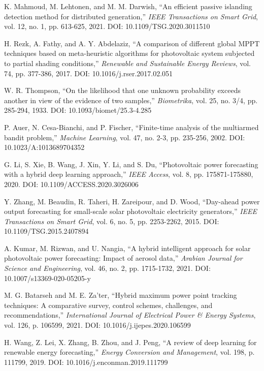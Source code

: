 \documentclass[conference]{IEEEtran}
\begin{document}
\begin{thebibliography}{00}

 K. Mahmoud, M. Lehtonen, and M. M. Darwish, ``An efficient passive islanding detection method for distributed generation,'' \emph{IEEE Transactions on Smart Grid}, vol. 12, no. 1, pp. 613-625, 2021. DOI: 10.1109/TSG.2020.3011510

 H. Rezk, A. Fathy, and A. Y. Abdelaziz, ``A comparison of different global MPPT techniques based on meta-heuristic algorithms for photovoltaic system subjected to partial shading conditions,'' \emph{Renewable and Sustainable Energy Reviews}, vol. 74, pp. 377-386, 2017. DOI: 10.1016/j.rser.2017.02.051

 W. R. Thompson, ``On the likelihood that one unknown probability exceeds another in view of the evidence of two samples,'' \emph{Biometrika}, vol. 25, no. 3/4, pp. 285-294, 1933. DOI: 10.1093/biomet/25.3-4.285

 P. Auer, N. Cesa-Bianchi, and P. Fischer, ``Finite-time analysis of the multiarmed bandit problem,'' \emph{Machine Learning}, vol. 47, no. 2-3, pp. 235-256, 2002. DOI: 10.1023/A:1013689704352

 G. Li, S. Xie, B. Wang, J. Xin, Y. Li, and S. Du, ``Photovoltaic power forecasting with a hybrid deep learning approach,'' \emph{IEEE Access}, vol. 8, pp. 175871-175880, 2020. DOI: 10.1109/ACCESS.2020.3026006

 Y. Zhang, M. Beaudin, R. Taheri, H. Zareipour, and D. Wood, ``Day-ahead power output forecasting for small-scale solar photovoltaic electricity generators,'' \emph{IEEE Transactions on Smart Grid}, vol. 6, no. 5, pp. 2253-2262, 2015. DOI: 10.1109/TSG.2015.2407894

 A. Kumar, M. Rizwan, and U. Nangia, ``A hybrid intelligent approach for solar photovoltaic power forecasting: Impact of aerosol data,'' \emph{Arabian Journal for Science and Engineering}, vol. 46, no. 2, pp. 1715-1732, 2021. DOI: 10.1007/s13369-020-05205-y

 M. G. Batarseh and M. E. Za'ter, ``Hybrid maximum power point tracking techniques: A comparative survey, control schemes, challenges, and recommendations,'' \emph{International Journal of Electrical Power \& Energy Systems}, vol. 126, p. 106599, 2021. DOI: 10.1016/j.ijepes.2020.106599

 H. Wang, Z. Lei, X. Zhang, B. Zhou, and J. Peng, ``A review of deep learning for renewable energy forecasting,'' \emph{Energy Conversion and Management}, vol. 198, p. 111799, 2019. DOI: 10.1016/j.enconman.2019.111799


\end{thebibliography}
\end{document}
